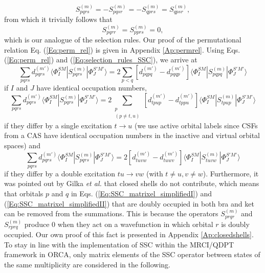 	\begin{equation}
	\label{Eq:perm_rel}
	S_{pqrs}^{(m)} =  - S_{pqsr}^{(m)} =  - S_{qprs}^{(m)} = S_{qpsr}^{(m)},
	\end{equation} 	
from which it trivially follows that
	\begin{equation}
	\label{Eq:selection_rules_SSC}
	S_{pqrr}^{(m)} = S_{pprs}^{(m)} = 0,
	\end{equation} 	
which is our analogue of the selection rules. Our proof of the permutational relation Eq. (\ref{Eq:perm_rel}) is given in Appendix \ref{Ap:permrel}. Using Eqs. (\ref{Eq:perm_rel}) and (\ref{Eq:selection_rules_SSC}), we arrive at
	\begin{equation}
	\label{Eq:SSC_matrixel_simplifiedI}
	\sum\limits_{pqrs} {d_{pqrs}^{(m')}} \langle \Phi _I^{SM}|S_{pqrs}^{(m)}|\Phi _J^{S'M'}\rangle  = 2\sum\limits_{p < q} {[d_{pqpq}^{(m')} - d_{pqqp}^{(m')}]} \langle \Phi _I^{SM}|S_{pqpq}^{(m)}|\Phi _J^{S'M'}\rangle 
	\end{equation} 	
if $I$ and $J$ have identical occupation numbers,
\begin{equation}
\label{Eq:SSC_matrixel_simplifiedII}
	\sum_{pqrs} {d_{pqrs}^{(m')}} \langle \Phi_I^{SM}|S_{pqrs}^{(m)}|\Phi_J^{S'M'}\rangle  = 2\sum_{\substack{p \\  (p \ne t,u) }} {[d_{tpup}^{(m')} - d_{tppu}^{(m')}]} \langle \Phi_I^{SM}|S_{tpup}^{(m)}|\Phi_J^{S'M'}\rangle
\end{equation}
if they differ by a single excitation $t \to u$ (we use active orbital labels since CSFs from a CAS have identical occupation numbers in the inactive and virtual orbital spaces) and 
	\begin{equation}
	\label{Eq:SSC_matrixel_simplifiedIII}
	\sum\limits_{pqrs} {d_{pqrs}^{(m')}} \langle \Phi _I^{SM}|S_{pqrs}^{(m)}|\Phi _J^{S'M'}\rangle  = 2[d_{tuvw}^{(m')} - d_{tuwv}^{(m')}]\langle \Phi _I^{SM}|S_{tuvw}^{(m)}|\Phi _J^{S'M'}\rangle 
	\end{equation} 	
if they differ by a double excitation $tu \to vw$ (with $t \ne u,    v \ne w$).
Furthermore, it was pointed out by Gilka \textit{et al.} that closed shells do not contribute,\cite{GilkaTM_2008_44102} which means that orbitals $p$ and $q$ in Eqs. (\ref{Eq:SSC_matrixel_simplifiedI}) and (\ref{Eq:SSC_matrixel_simplifiedII}) that are doubly occupied in both bra and ket can be removed from the summations. This is because the operators $S_{prqr}^{(m)}$ and $S_{rprq}^{(m)}$ produce 0 when they act on a wavefunction in which orbital $r$ is doubly occupied. Our own proof of this fact is presented in Appendix \ref{Ap:closedshells}.
To stay in line with the implementation of SSC within the MRCI/QDPT framework in ORCA,\cite{GanyuN_2008_114117} only matrix elements of the SSC operator between states of the same multiplicity are considered in the following.

